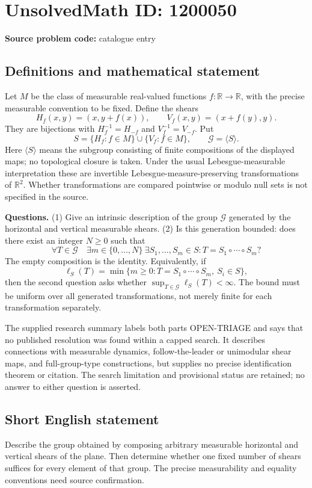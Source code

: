 \documentclass[11pt]{article}
\newcommand{\R}{\mathbb{R}}
\begin{document}
\section*{UnsolvedMath ID: 1200050}
\textbf{Source problem code:} catalogue entry
\subsection{Definitions and mathematical statement}
Let $M$ be the class of measurable real-valued functions $f:\R\to\R$, with the precise measurable convention to be fixed. Define the shears
\[
 H_f(x,y)=(x,y+f(x)),\qquad V_f(x,y)=(x+f(y),y).
\]
They are bijections with $H_f^{-1}=H_{-f}$ and $V_f^{-1}=V_{-f}$. Put
\[
 S=\{H_f:f\in M\}\cup\{V_f:f\in M\},\qquad
 \mathcal G=\langle S\rangle.
\]
Here $\langle S\rangle$ means the subgroup consisting of finite compositions of the displayed maps; no topological closure is taken. Under the usual Lebesgue-measurable interpretation these are invertible Lebesgue-measure-preserving transformations of $\R^2$. Whether transformations are compared pointwise or modulo null sets is not specified in the source.

\textbf{Questions.} (1) Give an intrinsic description of the group $\mathcal G$ generated by the horizontal and vertical measurable shears. (2) Is this generation bounded: does there exist an integer $N\geq0$ such that
\[
 \forall T\in\mathcal G\quad
 \exists m\in\{0,\ldots,N\}\ \exists S_1,\ldots,S_m\in S:
 T=S_1\circ\cdots\circ S_m?
\]
The empty composition is the identity. Equivalently, if
\[
 \ell_S(T)=\min\{m\geq0:T=S_1\circ\cdots\circ S_m,\ S_i\in S\},
\]
then the second question asks whether $\sup_{T\in\mathcal G}\ell_S(T)<\infty$. The bound must be uniform over all generated transformations, not merely finite for each transformation separately.

The supplied research summary labels both parts OPEN-TRIAGE and says that no published resolution was found within a capped search. It describes connections with measurable dynamics, follow-the-leader or unimodular shear maps, and full-group-type constructions, but supplies no precise identification theorem or citation. The search limitation and provisional status are retained; no answer to either question is asserted.
\subsection{Short English statement}
Describe the group obtained by composing arbitrary measurable horizontal and vertical shears of the plane. Then determine whether one fixed number of shears suffices for every element of that group. The precise measurability and equality conventions need source confirmation.
\end{document}
